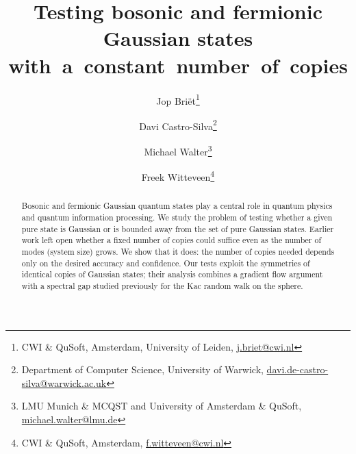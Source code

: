 \documentclass[11pt,a4paper]{article}
\numberwithin{equation}{section}
\newcommand{\1}{\mathbf{1}}
\begin{document}
\title{Testing bosonic and fermionic Gaussian states with~a~constant~number~of~copies}
\author{Jop Bri\"{e}t\thanks{CWI \& QuSoft, Amsterdam, University of Leiden, \href{mailto:j.briet@cwi.nl}{j.briet@cwi.nl}}
\and
Davi Castro-Silva\thanks{Department of Computer Science, University of Warwick, \href{mailto:davi.de-castro-silva@warwick.ac.uk}{davi.de-castro-silva@warwick.ac.uk}}
\and
Michael Walter\thanks{LMU Munich \& MCQST and University of Amsterdam \& QuSoft, \href{mailto:michael.walter@lmu.de}{michael.walter@lmu.de}}
\and
Freek Witteveen\thanks{CWI \& QuSoft, Amsterdam, \href{mailto:f.witteveen@cwi.nl}{f.witteveen@cwi.nl}}}
\date{}
\maketitle
\begin{abstract}
Bosonic and fermionic Gaussian quantum states play a central role in quantum physics and quantum information processing.
We study the problem of testing whether a given pure state is Gaussian or is bounded away from the set of pure Gaussian states.
Earlier work left open whether a fixed number of copies could suffice even as the number of modes (system size) grows.
We show that it does: the number of copies needed depends only on the desired accuracy and confidence.
Our tests exploit the symmetries of identical copies of Gaussian states; their analysis combines a gradient flow argument with a spectral gap studied previously for the Kac random walk on the sphere.
\end{abstract}

\end{document}
